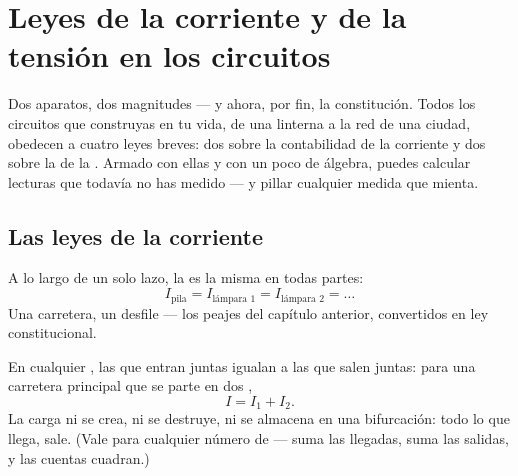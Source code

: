 \chapter{Leyes de la corriente y de la tensión en los circuitos}\label{ch:g8:circuit-laws}

Dos aparatos, dos magnitudes --- y ahora, por fin, la constitución.
Todos los circuitos que construyas en tu vida, de una linterna a la red
de una ciudad, obedecen a cuatro leyes breves: dos sobre la
contabilidad de la corriente y dos sobre la de la
. Armado con ellas y con un poco de álgebra, puedes
calcular lecturas que todavía no has medido --- y pillar cualquier
medida que mienta.

\section{Las leyes de la corriente}

\begin{proposition}\label{prop:g8:circuit-laws:seriesI}
A lo largo de un solo lazo, la  es la misma en todas
partes:
\[
I_{\text{pila}} = I_{\text{lámpara 1}} = I_{\text{lámpara 2}} =
\dots
\]
Una carretera, un desfile --- los peajes del capítulo anterior,
convertidos en ley constitucional.
\end{proposition}

\begin{proposition}\label{prop:g8:circuit-laws:junction}
En cualquier , las  que entran juntas igualan a
las  que salen juntas: para una carretera principal que se
parte en dos ,
\[
I = I_1 + I_2 .
\]
La carga ni se crea, ni se destruye, ni se almacena en una
bifurcación: todo lo que llega, sale. (Vale para cualquier número de
 --- suma las llegadas, suma las salidas, y las cuentas
cuadran.)
\end{proposition}

